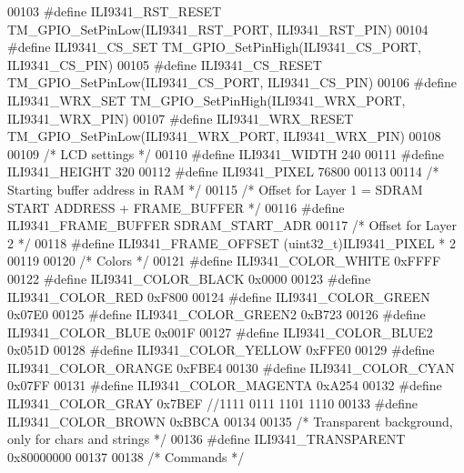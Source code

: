 \begin{DoxyCode}
00103 \textcolor{preprocessor}{#define ILI9341\_RST\_RESET           TM\_GPIO\_SetPinLow(ILI9341\_RST\_PORT, ILI9341\_RST\_PIN)}
00104 \textcolor{preprocessor}{#define ILI9341\_CS\_SET              TM\_GPIO\_SetPinHigh(ILI9341\_CS\_PORT, ILI9341\_CS\_PIN)}
00105 \textcolor{preprocessor}{#define ILI9341\_CS\_RESET            TM\_GPIO\_SetPinLow(ILI9341\_CS\_PORT, ILI9341\_CS\_PIN)}
00106 \textcolor{preprocessor}{#define ILI9341\_WRX\_SET             TM\_GPIO\_SetPinHigh(ILI9341\_WRX\_PORT, ILI9341\_WRX\_PIN)}
00107 \textcolor{preprocessor}{#define ILI9341\_WRX\_RESET           TM\_GPIO\_SetPinLow(ILI9341\_WRX\_PORT, ILI9341\_WRX\_PIN)}
00108 
00109 \textcolor{comment}{/* LCD settings */}
00110 \textcolor{preprocessor}{#define ILI9341\_WIDTH               240}
00111 \textcolor{preprocessor}{#define ILI9341\_HEIGHT              320}
00112 \textcolor{preprocessor}{#define ILI9341\_PIXEL               76800}
00113 
00114 \textcolor{comment}{/* Starting buffer address in RAM */}
00115 \textcolor{comment}{/* Offset for Layer 1 = SDRAM START ADDRESS + FRAME\_BUFFER */}
00116 \textcolor{preprocessor}{#define ILI9341\_FRAME\_BUFFER        SDRAM\_START\_ADR}
00117 \textcolor{comment}{/* Offset for Layer 2 */}
00118 \textcolor{preprocessor}{#define ILI9341\_FRAME\_OFFSET        (uint32\_t)ILI9341\_PIXEL * 2}
00119 
00120 \textcolor{comment}{/* Colors */}
00121 \textcolor{preprocessor}{#define ILI9341\_COLOR\_WHITE         0xFFFF}
00122 \textcolor{preprocessor}{#define ILI9341\_COLOR\_BLACK         0x0000}
00123 \textcolor{preprocessor}{#define ILI9341\_COLOR\_RED           0xF800}
00124 \textcolor{preprocessor}{#define ILI9341\_COLOR\_GREEN         0x07E0}
00125 \textcolor{preprocessor}{#define ILI9341\_COLOR\_GREEN2        0xB723}
00126 \textcolor{preprocessor}{#define ILI9341\_COLOR\_BLUE          0x001F}
00127 \textcolor{preprocessor}{#define ILI9341\_COLOR\_BLUE2         0x051D}
00128 \textcolor{preprocessor}{#define ILI9341\_COLOR\_YELLOW        0xFFE0}
00129 \textcolor{preprocessor}{#define ILI9341\_COLOR\_ORANGE        0xFBE4}
00130 \textcolor{preprocessor}{#define ILI9341\_COLOR\_CYAN          0x07FF}
00131 \textcolor{preprocessor}{#define ILI9341\_COLOR\_MAGENTA       0xA254}
00132 \textcolor{preprocessor}{#define ILI9341\_COLOR\_GRAY          0x7BEF //1111 0111 1101 1110}
00133 \textcolor{preprocessor}{#define ILI9341\_COLOR\_BROWN         0xBBCA}
00134 
00135 \textcolor{comment}{/* Transparent background, only for chars and strings */}
00136 \textcolor{preprocessor}{#define ILI9341\_TRANSPARENT         0x80000000}
00137 
00138 \textcolor{comment}{/* Commands */}

\end{DoxyCode}
